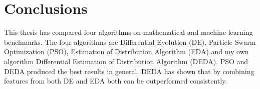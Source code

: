 \section{Conclusions}

This thesis has compared four algorithms on mathematical and machine learning benchmarks. The four algorithms are Differential Evolution (DE), Particle Swarm Optimization (PSO), Estimation of Distribution Algorithm (EDA) and my own algorithm Differential Estimation of Distribution Algorithm (DEDA). PSO and DEDA produced the best results in general. DEDA has shown that by combining features from both DE and EDA both can be outperformed consistently.

